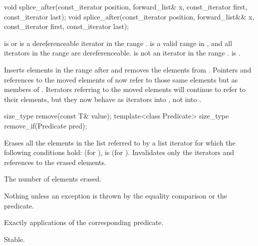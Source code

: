 %
\begin{itemdecl}
void splice_after(const_iterator position, forward_list& x,
                  const_iterator first, const_iterator last);
void splice_after(const_iterator position, forward_list&& x,
                  const_iterator first, const_iterator last);
\end{itemdecl}

\begin{itemdescr}
\pnum
\expects
{} is  or is a
dereferenceable iterator in the range .  is a
valid range in , and all iterators in the range  are
dereferenceable.  is not an iterator in the range .
 is .

\pnum
\effects
Inserts elements in the range  after  and
removes the elements from . Pointers and references to the moved elements of
 now refer to those same elements but as members of . Iterators
referring to the moved elements will continue to refer to their elements, but they now
behave as iterators into , not into .

\pnum
\complexity
{}
\end{itemdescr}

%
%
\begin{itemdecl}
size_type remove(const T& value);
template<class Predicate> size_type remove_if(Predicate pred);
\end{itemdecl}

\begin{itemdescr}
\pnum
\effects
Erases all the elements in the list referred to by a list iterator  for
which the following conditions hold:  (for ),
 is  (for ).
Invalidates only the iterators and references to the erased elements.

\pnum
\returns
The number of elements erased.

\pnum
\throws
Nothing unless an exception is thrown by the equality comparison or the
predicate.

\pnum
\complexity
Exactly  applications of the corresponding
predicate.

\pnum
\remarks
Stable.
\end{itemdescr}

